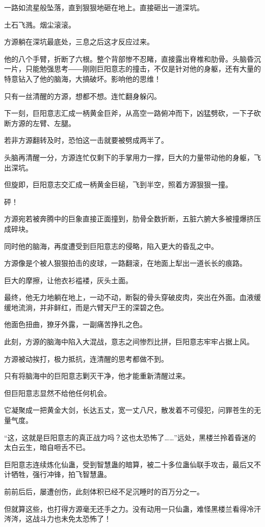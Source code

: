 \begin{this_body}
一路如流星般坠落，直到狠狠地砸在地上。直接砸出一道深坑。

土石飞溅。烟尘滚滚。

方源躺在深坑最底处，三息之后这才反应过来。

他的八个手臂，折断了六根。整个背部惨不忍睹，直接露出脊椎和肋骨。头脑昏沉一片，只能勉强思考――刚刚巨阳意志的撞击，不仅是针对他的身躯，还有大量的特意钻入了他的脑海，大搞破坏。影响他的思维！

只有一丝清醒的方源，想都不想。连忙翻身躲闪。

下一刻，巨阳意志汇成一柄黄金巨斧，从高空一路俯冲而下，凶猛劈砍，一下子砍断方源的左臂、左腿。

若非方源翻转及时，恐怕这一击就要被劈成两半了。

头脑再清醒一分，方源连忙仅剩下的手掌用力一撑，巨大的力量带动他的身躯，飞出深坑。

但旋即，巨阳意志交汇成一柄黄金巨槌，飞到半空，照着方源狠狠一撞。

砰！

方源宛若被奔腾中的巨象直接正面撞到，肋骨全数折断，五脏六腑大多被撞爆挤压成碎块。

同时他的脑海，再度遭受到巨阳意志的侵略，陷入更大的昏乱之中。

方源像是个被人狠狠拍击的皮球，一路翻滚，在地面上犁出一道长长的痕路。

巨大的摩擦，让他衣衫褴褛，灰头土面。

最终，他无力地躺在地上，一动不动，断裂的骨头穿破皮肉，突出在外面。血液缓缓地流淌，并非鲜红，而是六臂天尸王的深碧之色。

他面色扭曲，獠牙外露，一副痛苦挣扎之色。

此刻，方源的脑海中陷入大混战，意志之间惨烈比拼，巨阳意志牢牢占据上风。

方源被动挨打，极力抵抗，连清醒的思考都做不到。

只有将脑海中的巨阳意志剿灭干净，他才能重新清醒过来。

但巨阳意志显然不给他任何机会。

它凝聚成一把黄金大剑，长达五丈，宽一丈八尺，散发着不可侵犯，问罪苍生的无量气度。

“这，这就是巨阳意志的真正战力吗？这也太恐怖了……”远处，黑楼兰拎着昏迷的太白云生，暗自咂舌不已。

巨阳意志连续炼化仙蛊，受到智慧蛊的暗算，被二十多位蛊仙联手攻击，最后又不计牺牲，强行冲锋，拍飞智慧蛊。

前前后后，屡遭创伤，此刻体积已经不足沉睡时的百万分之一。

但就算这些，也打得方源毫无还手之力。没有动用一只仙蛊，难怪黑楼兰看得冷汗涔涔，这战斗力也未免太恐怖了！


\end{this_body}
